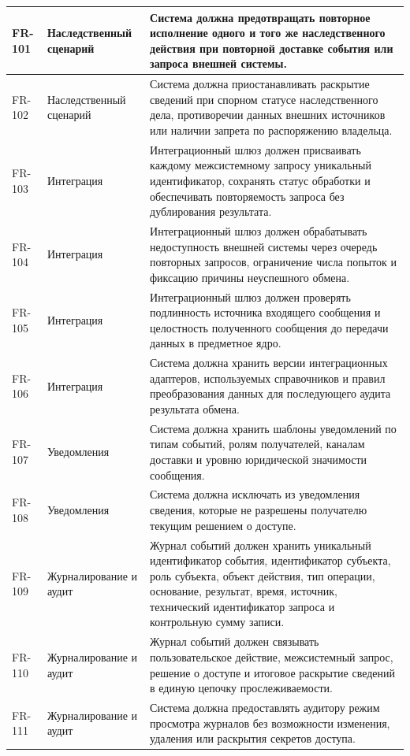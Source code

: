 \begin{longtable}{|P{1.45cm}|P{3.35cm}|P{10.7cm}|}
FR-101 & Наследственный сценарий & Система должна предотвращать повторное исполнение одного и того же наследственного действия при повторной доставке события или запроса внешней системы.\\ \hline
FR-102 & Наследственный сценарий & Система должна приостанавливать раскрытие сведений при спорном статусе наследственного дела, противоречии данных внешних источников или наличии запрета по распоряжению владельца.\\ \hline
FR-103 & Интеграция & Интеграционный шлюз должен присваивать каждому межсистемному запросу уникальный идентификатор, сохранять статус обработки и обеспечивать повторяемость запроса без дублирования результата.\\ \hline
FR-104 & Интеграция & Интеграционный шлюз должен обрабатывать недоступность внешней системы через очередь повторных запросов, ограничение числа попыток и фиксацию причины неуспешного обмена.\\ \hline
FR-105 & Интеграция & Интеграционный шлюз должен проверять подлинность источника входящего сообщения и целостность полученного сообщения до передачи данных в предметное ядро.\\ \hline
FR-106 & Интеграция & Система должна хранить версии интеграционных адаптеров, используемых справочников и правил преобразования данных для последующего аудита результата обмена.\\ \hline
FR-107 & Уведомления & Система должна хранить шаблоны уведомлений по типам событий, ролям получателей, каналам доставки и уровню юридической значимости сообщения.\\ \hline
FR-108 & Уведомления & Система должна исключать из уведомления сведения, которые не разрешены получателю текущим решением о доступе.\\ \hline
FR-109 & Журналирование и аудит & Журнал событий должен хранить уникальный идентификатор события, идентификатор субъекта, роль субъекта, объект действия, тип операции, основание, результат, время, источник, технический идентификатор запроса и контрольную сумму записи.\\ \hline
FR-110 & Журналирование и аудит & Журнал событий должен связывать пользовательское действие, межсистемный запрос, решение о доступе и итоговое раскрытие сведений в единую цепочку прослеживаемости.\\ \hline
FR-111 & Журналирование и аудит & Система должна предоставлять аудитору режим просмотра журналов без возможности изменения, удаления или раскрытия секретов доступа.\\ \hline

\end{longtable}
